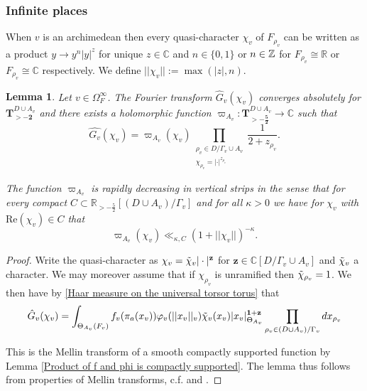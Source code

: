 \documentclass[a4paper,11pt,reqno]{amsart}
\newcommand{\R}{\mathbb{R}}
\newcommand{\C}{\mathbb{C}}
\renewcommand{\Re}{\mathrm{Re}}
\newtheorem{lemma}[theorem]{Lemma}
\theoremstyle{definition}
\begin{document}
\subsubsection{Infinite places}
When $v$ is an archimedean then every quasi-character $\chi_v$ of $F_{\rho_v}$ can be written as a product $y \to y^n |y|^{z}$ for unique $z \in \C$ and $n \in \{0,1\}$ or $n \in \mathbb{Z}$ for $F_{\rho_v} \cong \R$ or $F_{\rho_v} \cong \C$ respectively. We define $||\chi_v|| := \max(|z|, n)$.
\begin{lemma}\label{lem:Local Mellin transform at archimedean places}
	Let $v \in \Omega_F^{\infty}$. The Fourier transform $\hat{G}_v(\chi_v)$ converges absolutely for $\mathbf{T}_{> \mathbf{-2}}^{D \cup A_v}$ and there exists a holomorphic function $\varpi_{A_v}: \mathbf{T}_{> \mathbf{-\frac{5}{2}}}^{D \cup A_v} \to \C$ such that
	\begin{equation*}
		\hat{G_v}(\chi_v) = \varpi_{A_v}( \chi_v) \prod_{\substack{\rho_v \in D / \Gamma_v \cup A_v \\ \chi_{\rho_v} = |\cdot|^{z_{\rho_v}}}} \frac{1}{2 + z_{\rho_v}}.
	\end{equation*}

	The function $\varpi_{A_v}$ is rapidly decreasing in vertical strips in the sense that for every compact $C \subset \R_{> -\frac{5}{2}}[(D \cup A_v)/\Gamma_v]$ and for all $\kappa > 0$ we have for $\chi_v$ with $\Re(\chi_v) \in C$ that
	\begin{equation*}
		\varpi_{A_v}(\chi_v) \ll_{\kappa, C} (1 + ||\chi_v||)^{- \kappa}.
	\end{equation*}
\end{lemma}
\begin{proof}
	Write the quasi-character as $\chi_v = \Tilde{\chi}_v | \cdot |^{\mathbf{z}}$ for $\mathbf{z} \in \C[D / \Gamma_v \cup A_v]$ and $\Tilde{\chi}_v$ a character. We may moreover assume that if $\chi_{\rho_v}$ is unramified then $\Tilde{\chi}_{\rho_v} = 1$. We then have by \eqref{Haar measure on the universal torsor torus} that
	\begin{equation*}
	\hat{G}_v(\chi_v) = \int_{\Theta_{A_v}(F_v)} f_v(\pi_a(x_v)) \varphi_v(||x_v||_v) \Tilde{\chi}_v(x_v) |x_v|^{\mathbf{1} + \mathbf{z}}_{\Theta_{A_v}} \prod_{\rho_v \in (D \cup A_v) / \Gamma_v} d x_{\rho_v}
	\end{equation*}

	This is the Mellin transform of a smooth compactly supported function by Lemma \ref{Product of f and phi is compactly supported}. The lemma thus follows from properties of Mellin transforms, c.f. \cite[Lemma~3.3]{Chambert-Loir2010Igusa} and \cite[Lemma~3.4.1]{Chambert-Loir2010Integral}.
\end{proof}
\end{document}
